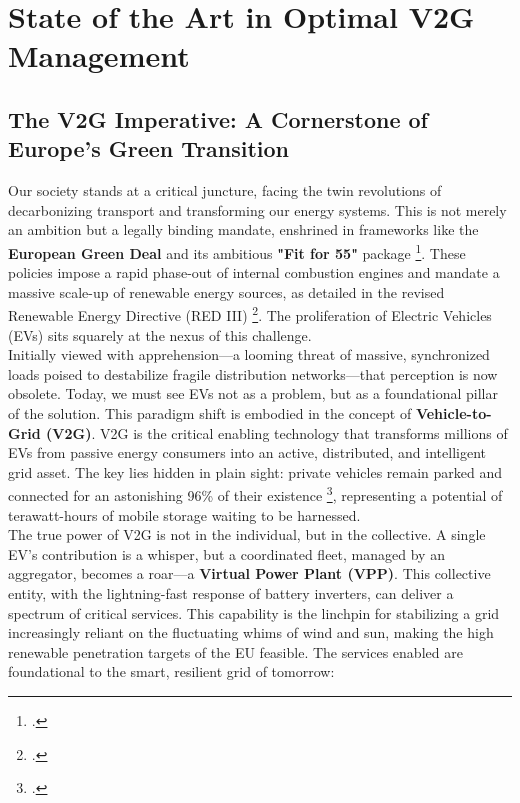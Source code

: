 \chapter{State of the Art in Optimal V2G Management}
\label{chap:state_of_the_art}
\section{The V2G Imperative: A Cornerstone of Europe's Green Transition}
Our society stands at a critical juncture, facing the twin revolutions of decarbonizing transport and transforming our energy systems. This is not merely an ambition but a legally binding mandate, enshrined in frameworks like the \textbf{European Green Deal} and its ambitious \textbf{"Fit for 55"} package \footcite{european_commission_2021_fit_for_55}. These policies impose a rapid phase-out of internal combustion engines and mandate a massive scale-up of renewable energy sources, as detailed in the revised Renewable Energy Directive (RED III) \footcite{RED_III_directive_2023}. The proliferation of Electric Vehicles (EVs) sits squarely at the nexus of this challenge.
\\
\noindent
Initially viewed with apprehension—a looming threat of massive, synchronized loads poised to destabilize fragile distribution networks—that perception is now obsolete. Today, we must see EVs not as a problem, but as a foundational pillar of the solution. This paradigm shift is embodied in the concept of \textbf{Vehicle-to-Grid (V2G)}. V2G is the critical enabling technology that transforms millions of EVs from passive energy consumers into an active, distributed, and intelligent grid asset. The key lies hidden in plain sight: private vehicles remain parked and connected for an astonishing 96\% of their existence \footcite{evertsson2024investigating}, representing a potential of terawatt-hours of mobile storage waiting to be harnessed.
\\
\noindent
The true power of V2G is not in the individual, but in the collective. A single EV's contribution is a whisper, but a coordinated fleet, managed by an aggregator, becomes a roar—a \textbf{Virtual Power Plant (VPP)}. This collective entity, with the lightning-fast response of battery inverters, can deliver a spectrum of critical services. This capability is the linchpin for stabilizing a grid increasingly reliant on the fluctuating whims of wind and sun, making the high renewable penetration targets of the EU feasible. The services enabled are foundational to the smart, resilient grid of tomorrow:
